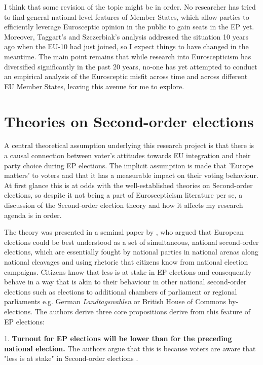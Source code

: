 I think that some revision of the topic might be in order. No researcher has tried to find general national-level features of Member States, which allow parties to efficiently leverage Eurosceptic opinion in the public to gain seats in the EP yet. Moreover, Taggart’s and Szczerbiak’s analysis addressed the situation 10 years ago when the EU-10 had just joined, so I expect things to have changed in the meantime. The main point remains that while research into Euroscepticism has diversified significantly in the past 20 years, no-one has yet attempted to conduct an empirical analysis of the Eurosceptic misfit across time and across different EU Member States, leaving this avenue for me to explore. 

\section{Theories on Second-order elections}
A central theoretical assumption underlying this research project is that there is a causal connection between voter's attitudes towards EU integration and their party choice during EP elections. The implicit assumption is made that 'Europe matters' to voters and that it has a measurable impact on their voting behaviour. At first glance this is at odds with the well-established theories on Second-order elections, so despite it not being a part of Euroscepticism literature per se, a discussion of the Second-order election theory and how it affects my research agenda is in order.

The theory was presented in a seminal paper by , who argued that European elections could be best understood as a set of simultaneous, national second-order elections, which are essentially fought by national parties in national arenas along national cleavages and using rhetoric that citizens know from national election campaigns. Citizens know that less is at stake in EP elections and consequently behave in a way that is akin to their behaviour in other national second-order elections such as elections to additional chambers of parliament or regional parliaments e.g. German \textit{Landtagswahlen} or British House of Commons by-elections.
The authors derive three core propositions derive from this feature of EP elections: 

1. \textbf{Turnout for EP elections will be lower than for the preceding national election.} The authors argue that this is because voters are aware that "less is at stake" in Second-order elections \cite{Irwin1995}. 


